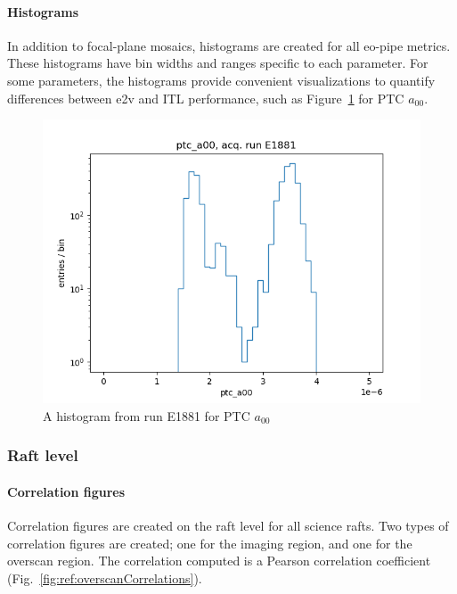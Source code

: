 \paragraph{Histograms}

In addition to focal-plane mosaics, histograms are created for all eo-pipe metrics. These histograms have bin widths and ranges specific to each parameter. For some parameters, the histograms provide convenient visualizations to quantify differences between e2v and ITL performance, such as Figure~\ref{fig:ref:histogram} for PTC $a_{00}$. 

\begin{figure}[ht]
    \centering
    \includegraphics[width=0.8\linewidth]{figures/ReferenceFigures/ptc_a00_hist_LSSTCam_u_lsstccs_eo_ptc_plots_E1881_w_2024_35_20241105T131208Z.png}
    \caption{A histogram from run E1881 for PTC $a_{00}$}
    \label{fig:ref:histogram}
\end{figure}
\clearpage
\subsubsection{Raft level}

\paragraph{Correlation figures}

Correlation figures are created on the raft level for all science rafts. Two types of correlation figures are created; one for the imaging region, and one for the overscan region. The correlation computed is a Pearson correlation coefficient (Fig.~\ref{fig:ref:overscanCorrelations}).

